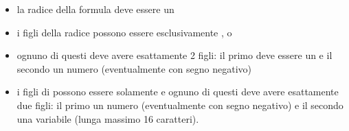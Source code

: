 \documentclass[11pt,letterpaper,twoside]{article}
\begin{document}
\begin{itemize}
\item la radice della formula deve essere un 
\item i figli della radice possono essere esclusivamente \inline{>}, \inline{=} o 
\item ognuno di questi deve avere esattamente 2 figli: il primo deve essere un \inline{+} e
  il secondo un numero (eventualmente con segno negativo)
\item i figli di \inline{+} possono essere solamente \inline{*} e ognuno di questi deve avere
  esattamente due figli: il primo un numero (eventualmente con segno negativo) e il secondo una
  variabile (lunga massimo 16 caratteri).
\end{itemize}

\newpage
\tableofcontents

\newpage \printbibliography
\end{document}
